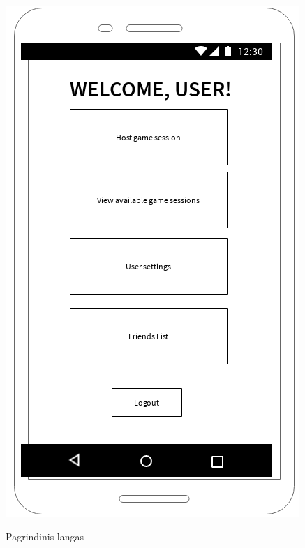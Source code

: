 \documentclass{VUMIFPSkursinis}
\begin{document}
\begin{figure}[H]
	\centering
	\caption{Pagrindinis langas}
	\includegraphics[scale=0.9]{img/main_window}
	\label{img:main_window}
\end{figure}
\end{document}
